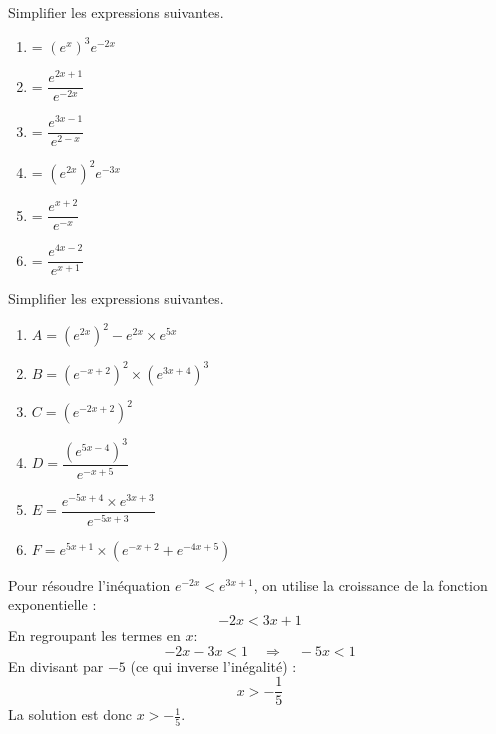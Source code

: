 \documentclass[11pt]{article}
\begin{document}
\begin{multicols}{2}
\begin{exercice}[1]
Simplifier les expressions suivantes.
\begin{multicols}{2}
\begin{enumerate}[label=\Alph*]
\item = $(e^x)^3e^{-2x}$
\item = $\dfrac{e^{2x+1}}{e^{-2x}}$
\item = $\dfrac{e^{3x-1}}{e^{2-x}}$
\item = $(e^{2x})^2e^{-3x}$
\item = $\dfrac{e^{x+2}}{e^{-x}}$
\item = $\dfrac{e^{4x-2}}{e^{x+1}}$
\end{enumerate}
\end{multicols}
\end{exercice}

\begin{exercice}[2]
Simplifier les expressions suivantes.
\begin{multicols}{2}
\begin{enumerate}[label={}]
\item $A = (e^{2x})^{2} - e^{2x} \times e^{5x}$
\item $B = (e^{-x+2})^{2} \times (e^{3x+4})^{3}$
\item $C = (e^{-2x+2})^{2}$
\item $D = \dfrac{(e^{5x-4})^{3}}{e^{-x+5}}$
\item $E = \dfrac{e^{-5x+4} \times e^{3x+3}}{e^{-5x+3}}$
\item $F = e^{5x+1} \times (e^{-x+2} + e^{-4x+5})$
\end{enumerate}
\end{multicols}
\end{exercice}
\end{multicols}

\begin{exercice}
Pour résoudre l'inéquation \( e^{-2x} < e^{3x+1} \), on utilise la croissance de la fonction exponentielle :
\[
-2x < 3x + 1
\]
En regroupant les termes en \( x \):
\[
-2x - 3x < 1 \quad \Rightarrow \quad -5x < 1
\]
En divisant par \(-5\) (ce qui inverse l'inégalité) :
\[
x > -\frac{1}{5}
\]
La solution est donc \( x > -\frac{1}{5} \).
\end{exercice}
\end{document}
